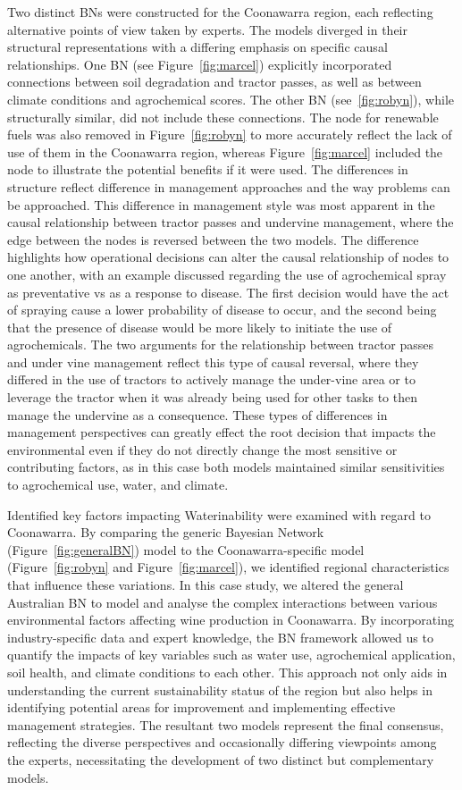 \documentclass[10pt,letterpaper]{article}
\begin{document}
Two distinct BNs were constructed for the Coonawarra region, each reflecting alternative points of view taken by experts. The models diverged in their structural representations with a differing emphasis on specific causal relationships. One BN (see Figure~\ref{fig:marcel}) explicitly incorporated connections between soil degradation and tractor passes, as well as between climate conditions and agrochemical scores. The other BN (see~\ref{fig:robyn}), while structurally similar, did not include these connections. The node for renewable fuels was also removed in Figure~\ref{fig:robyn} to more accurately reflect the lack of use of them in the Coonawarra region, whereas Figure~\ref{fig:marcel} included the node to illustrate the potential benefits if it were used. The differences in structure reflect difference in management approaches and the way problems can be approached. This difference in management style was most apparent in the causal relationship between tractor passes and undervine management, where the edge between the nodes is reversed between the two models. The difference highlights how operational decisions can alter the causal relationship of nodes to one another, with an example discussed regarding the use of agrochemical spray as preventative vs as a response to disease. The first decision would have the act of spraying cause a lower probability of disease to occur, and the second being that the presence of disease would be more likely to initiate the use of agrochemicals. The two arguments for the relationship between tractor passes and under vine management reflect this type of causal reversal, where they differed in the use of tractors to actively manage the under-vine area or to leverage the tractor when it was already being used for other tasks to then manage the undervine as a consequence. These types of differences in management perspectives can greatly effect the root decision that impacts the environmental even if they do not directly change the most sensitive or contributing factors, as in this case both models maintained similar sensitivities to agrochemical use, water, and climate.

Identified key factors impacting Waterinability were examined with regard to Coonawarra. By comparing the generic Bayesian Network (Figure~\ref{fig:generalBN}) model to the Coonawarra-specific model (Figure~\ref{fig:robyn} and Figure~\ref{fig:marcel}), we identified regional characteristics that influence these variations. In this case study, we altered the general Australian BN to model and analyse the complex interactions between various environmental factors affecting wine production in Coonawarra. By incorporating industry-specific data and expert knowledge, the BN framework allowed us to quantify the impacts of key variables such as water use, agrochemical application, soil health, and climate conditions to each other. This approach not only aids in understanding the current sustainability status of the region but also helps in identifying potential areas for improvement and implementing effective management strategies. The resultant two models represent the final consensus, reflecting the diverse perspectives and occasionally differing viewpoints among the experts, necessitating the development of two distinct but complementary models.
\end{document}
